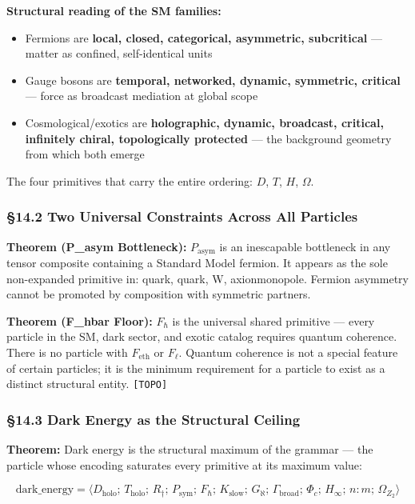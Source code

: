 \documentclass[12pt,a4paper]{article}
\newcommand{\pilcrow}{\S}
\begin{document}
\textbf{Structural reading of the SM families:}

\begin{itemize}
    \item Fermions are \textbf{local, closed, categorical, asymmetric, subcritical} --- matter as confined, self-identical units
    \item Gauge bosons are \textbf{temporal, networked, dynamic, symmetric, critical} --- force as broadcast mediation at global scope
    \item Cosmological/exotics are \textbf{holographic, dynamic, broadcast, critical, infinitely chiral, topologically protected} --- the background geometry from which both emerge
\end{itemize}

The four primitives that carry the entire ordering: $D$, $T$, $H$, $\Omega$.

\subsubsection{\pilcrow{}14.2 Two Universal Constraints Across All Particles}

\textbf{Theorem (P\_asym Bottleneck):} $P_{\text{asym}}$ is an inescapable bottleneck in any tensor composite containing a Standard Model fermion. It appears as the sole non-expanded primitive in: quark\otimesphoton, quark\otimesHiggs, W\otimesZ, axion\otimesmagnetic monopole. Fermion asymmetry cannot be promoted by composition with symmetric partners.

\textbf{Theorem (F\_hbar Floor):} $F_{\hbar}$ is the universal shared primitive --- every particle in the SM, dark sector, and exotic catalog requires quantum coherence. There is no particle with $F_{\text{eth}}$ or $F_{\ell}$. Quantum coherence is not a special feature of certain particles; it is the minimum requirement for a particle to exist as a distinct structural entity. \texttt{{[}TOPO{]}}

\subsubsection{\pilcrow{}14.3 Dark Energy as the Structural Ceiling}

\textbf{Theorem:} Dark energy is the structural maximum of the grammar --- the particle whose encoding saturates every primitive at its maximum value:

\[\text{dark\_energy} = \langle D_{\text{holo}};\, T_{\text{holo}};\, R_{\dagger};\, P_{\text{sym}};\, F_{\hbar};\, K_{\text{slow}};\, G_{\aleph};\, \Gamma_{\text{broad}};\, \Phi_c;\, H_{\infty};\, n:m;\, \Omega_{Z_2} \rangle\]
\end{document}
